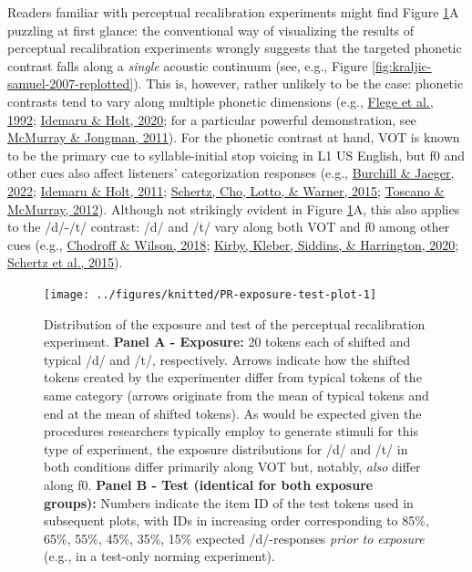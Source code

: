 \documentclass[
  11pt,
  english,
  man,floatsintext]{apa6}
\begin{document}
Readers familiar with perceptual recalibration experiments might find Figure \ref{fig:PR-exposure-test-plot}A puzzling at first glance: the conventional way of visualizing the results of perceptual recalibration experiments wrongly suggests that the targeted phonetic contrast falls along a \emph{single} acoustic continuum (see, e.g., Figure \ref{fig:kraljic-samuel-2007-replotted}). This is, however, rather unlikely to be the case: phonetic contrasts tend to vary along multiple phonetic dimensions (e.g., \protect\hyperlink{ref-flege1992}{Flege et al., 1992}; \protect\hyperlink{ref-idemaru-holt2020}{Idemaru \& Holt, 2020}; for a particular powerful demonstration, see \protect\hyperlink{ref-mcmurray-jongman2011}{McMurray \& Jongman, 2011}). For the phonetic contrast at hand, VOT is known to be the primary cue to syllable-initial stop voicing in L1 US English, but f0 and other cues also affect listeners' categorization responses (e.g., \protect\hyperlink{ref-burchill-jaeger2022}{Burchill \& Jaeger, 2022}; \protect\hyperlink{ref-idemaru-holt2011}{Idemaru \& Holt, 2011}; \protect\hyperlink{ref-schertz2015}{Schertz, Cho, Lotto, \& Warner, 2015}; \protect\hyperlink{ref-toscano-mcmurray2012}{Toscano \& McMurray, 2012}). Although not strikingly evident in Figure \ref{fig:PR-exposure-test-plot}A, this also applies to the /d/-/t/ contrast: /d/ and /t/ vary along both VOT and f0 among other cues (e.g., \protect\hyperlink{ref-chodroff-wilson2018}{Chodroff \& Wilson, 2018}; \protect\hyperlink{ref-kirby2020}{Kirby, Kleber, Siddins, \& Harrington, 2020}; \protect\hyperlink{ref-schertz2015}{Schertz et al., 2015}).



\begin{figure}

{\centering \texttt{[image: ../figures/knitted/PR-exposure-test-plot-1]} 

}

\caption{Distribution of the exposure and test of the perceptual recalibration experiment. \textbf{Panel A - Exposure:} 20 tokens each of shifted and typical /d/ and /t/, respectively. Arrows indicate how the shifted tokens created by the experimenter differ from typical tokens of the same category (arrows originate from the mean of typical tokens and end at the mean of shifted tokens). As would be expected given the procedures researchers typically employ to generate stimuli for this type of experiment, the exposure distributions for /d/ and /t/ in both conditions differ primarily along VOT but, notably, \emph{also} differ along f0. \textbf{Panel B - Test (identical for both exposure groups):} Numbers indicate the item ID of the test tokens used in subsequent plots, with IDs in increasing order corresponding to 85\%, 65\%, 55\%, 45\%, 35\%, 15\% expected /d/-responses \emph{prior to exposure} (e.g., in a test-only norming experiment).}\label{fig:PR-exposure-test-plot}
\end{figure}
\end{document}

